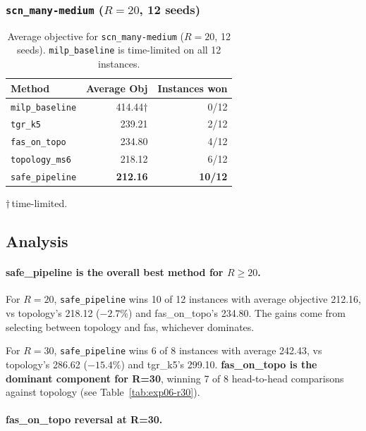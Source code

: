 \subsubsection{\texttt{scn\_many-medium} ($R=20$, 12 seeds)}

\begin{table}[h]
\centering
\caption{Average objective for \texttt{scn\_many-medium} ($R=20$, 12 seeds).
\texttt{milp\_baseline} is time-limited on all 12 instances.}
\label{tab:exp06-r20-avg}
\begin{tabular}{lrr}
\toprule
Method & Average Obj & Instances won \\
\midrule
\texttt{milp\_baseline}  & 414.44$\dagger$ & 0/12 \\
\texttt{tgr\_k5}         & 239.21 & 2/12 \\
\texttt{fas\_on\_topo}   & 234.80 & 4/12 \\
\texttt{topology\_ms6}   & 218.12 & 6/12 \\
\texttt{safe\_pipeline}  & \textbf{212.16} & \textbf{10/12} \\
\bottomrule
\end{tabular}
\end{table}

\noindent $\dagger$\,time-limited.

\subsection{Analysis}

\paragraph{safe\_pipeline is the overall best method for $R\geq 20$.}

For $R=20$, \texttt{safe\_pipeline} wins 10 of 12 instances with average
objective 212.16, vs topology's 218.12 ($-2.7\%$) and fas\_on\_topo's 234.80.
The gains come from selecting between topology and fas, whichever dominates.

For $R=30$, \texttt{safe\_pipeline} wins 6 of 8 instances with average
242.43, vs topology's 286.62 ($-15.4\%$) and tgr\_k5's 299.10.
\textbf{fas\_on\_topo is the dominant component for R=30}, winning 7 of 8
head-to-head comparisons against topology (see Table~\ref{tab:exp06-r30}).

\paragraph{fas\_on\_topo reversal at R=30.}

